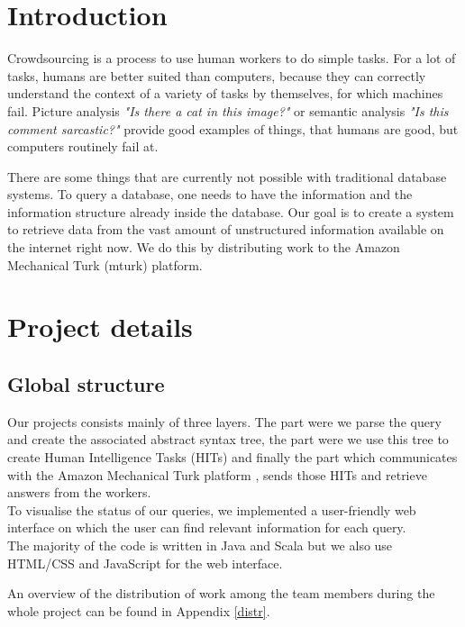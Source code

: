 \documentclass{article}
\begin{document}


\tableofcontents
\newpage


\section{Introduction}

Crowdsourcing is a process to use human workers to do simple tasks. For a lot of tasks, humans are better suited than computers, because they can correctly understand the context of a variety of tasks by themselves, for which machines fail. Picture analysis \textit{"Is there a cat in this image?"} or semantic analysis \textit{"Is this comment sarcastic?"} provide good examples of things, that humans are good, but computers routinely fail at.

There are some things that are currently not possible with traditional database systems. To query a database, one needs to have the information and the information structure already inside the database. Our goal is to create a system to retrieve data from the vast amount of unstructured information available on the internet right now. We do this by distributing work to the Amazon Mechanical Turk (mturk) platform.

\section{Project details}
\subsection{Global structure}
Our projects consists mainly of three layers. The part were we parse the query and create the associated abstract syntax tree, the part were we use this tree to create Human Intelligence Tasks (HITs) and finally the part which communicates with the Amazon Mechanical Turk platform , sends those HITs and retrieve answers from the workers.\\
To visualise the status of our queries, we implemented a user-friendly web interface on which the user can find relevant information for each query.\\ The majority of the code is written in Java and Scala but we also use HTML/CSS and JavaScript for the web interface.

An overview of the distribution of work among the team members during the whole project can be found in Appendix \ref{distr}.
\end{document}
